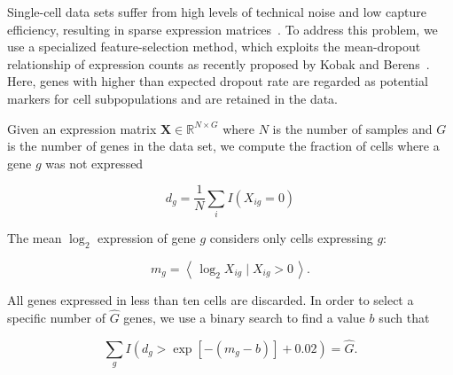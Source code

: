 \documentclass[runningheads]{llncs}
\begin{document}

Single-cell data sets suffer from high levels of technical noise and low
capture efficiency, resulting in sparse expression matrices~\cite{umi}. To
address this problem, we use a specialized feature-selection method, which
exploits the mean-dropout relationship of expression counts as recently
proposed by Kobak and Berens~\cite{Kobak2019}. Here, genes with higher
than expected dropout rate are regarded as potential markers for cell
subpopulations and are retained in the data.

Given an expression matrix $\mathbf{X} \in \mathbb{R}^{N \times G}$ where $N$
is the number of samples and $G$ is the number of genes in the data set, we
compute the fraction of cells where a gene $g$ was not expressed

\begin{equation}
d_g = \frac{1}{N} \sum_i I \left ( X_{ig} = 0\right )
\end{equation}

\noindent The mean $\log_2$ expression of gene $g$ considers only cells
expressing $g$:

\begin{equation}
m_g = \left \langle \, \log_2 X_{ig} \mid X_{ig} > 0 \, \right \rangle.
\end{equation}

All genes expressed in less than ten cells are discarded. In order to select a
specific number of $\hat{G}$ genes, we use a binary search to find a value $b$
such that

\begin{equation}
\sum_g I \left (d_g > \exp \left [ -(m_g - b) \right ] + 0.02 \right ) = \hat{G}.
\end{equation}
\end{document}
